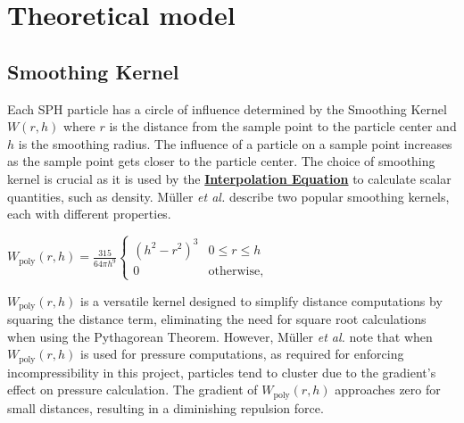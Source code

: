 \documentclass[write-up.tex]{subfiles}
\begin{document}
\section{Theoretical model}
\subsection{Smoothing Kernel}

Each SPH particle has a circle of influence determined by the Smoothing Kernel $W(r,h)$ where $r$ is the distance from the sample point to the particle center and $h$ is the smoothing radius. The influence of a particle on a sample point increases as the sample point gets closer to the particle center. The choice of smoothing kernel is crucial as it is used by the \hyperlink{Interpolation Equation}{\textbf{Interpolation Equation}} to calculate scalar quantities, such as density. Müller \textit{et al.}\cite{muller} describe two popular smoothing kernels, each with different properties.

\begin{center}
$
    W_{\text{poly}}(r, h) = \displaystyle \frac{315}{64 \pi h^9}
    \begin{cases}
        (h^2-r^2)^3 & 0 \leq r \leq h \\
        0 & \text{otherwise},
    \end{cases}
$
\end{center}


$W_{\text{poly}}(r, h)$ is a versatile kernel designed to simplify distance computations by squaring the distance term, eliminating the need for square root calculations when using the Pythagorean Theorem. However, Müller \textit{et al.}\cite{muller} note that when $W_{\text{poly}}(r, h)$ is used for pressure computations, as required for enforcing incompressibility in this project, particles tend to cluster due to the gradient's effect on pressure calculation. The gradient of $W_{\text{poly}}(r, h)$ approaches zero for small distances, resulting in a diminishing repulsion force.
\end{document}
